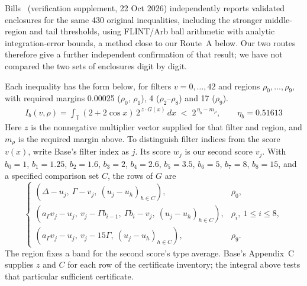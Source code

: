\documentclass[11pt]{article}
\theoremstyle{plain}
\begin{document}
Bills~\cite{bills} (verification supplement, 22 Oct 2026) independently reports validated enclosures for the same 430 original inequalities, including the stronger middle-region and tail thresholds, using FLINT/Arb ball arithmetic with analytic integration-error bounds, a method close to our Route~A below. Our two routes therefore give a further independent confirmation of that result; we have not compared the two sets of enclosures digit by digit.

Each inequality has the form below, for filters $v = 0,\dots,42$ and regions $\rho_0,\dots,\rho_9$, with required margins 0.00025 ($\rho_0$, $\rho_1$), 4 ($\rho_2$--$\rho_8$) and 17 ($\rho_9$).
\begin{gather*}
I_b(v,\rho) = \int_{\mathbb T} (2+2\cos x)\, 2^{\,z\cdot G(x)}\, dx \;<\; 2^{\,\eta_b - m_\rho}, \qquad \eta_b = 0.51613
\end{gather*}
Here $z$ is the nonnegative multiplier vector supplied for that filter and region, and $m_\rho$ is the required margin above. To distinguish filter indices from the score $v(x)$, write Base's filter index as $j$. Its score $w_j$ is our second score $v_j$. With $b_0=1$, $b_1=1.25$, $b_2=1.6$, $b_3=2$, $b_4=2.6$, $b_5=3.5$, $b_6=5$, $b_7=8$, $b_8=15$, and a specified comparison set $C$, the rows of $G$ are
\[
\begin{cases}
(\Delta-u_j,\ \Gamma-v_j,\ (u_j-u_h)_{h\in C}),&\rho_0,\\
(a_\Gamma v_j-u_j,\ v_j-\Gamma b_{i-1},\ \Gamma b_i-v_j,\ (u_j-u_h)_{h\in C}),&\rho_i,\ 1\le i\le8,\\
(a_\Gamma v_j-u_j,\ v_j-15\Gamma,\ (u_j-u_h)_{h\in C}),&\rho_9.
\end{cases}
\]
The region fixes a band for the second score's type average. Base's Appendix~C supplies $z$ and $C$ for each row of the certificate inventory; the integral above tests that particular sufficient certificate.
\end{document}
